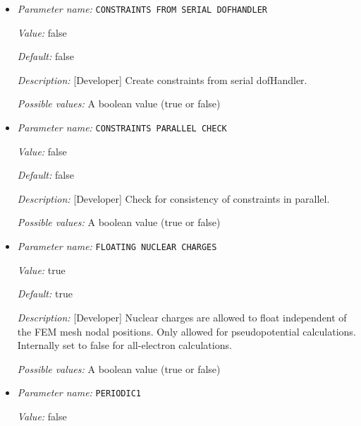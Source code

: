 \begin{itemize}
\item {\it Parameter name:} {\tt CONSTRAINTS FROM SERIAL DOFHANDLER}
\label{parameters:Boundary conditions/CONSTRAINTS FROM SERIAL DOFHANDLER}
\label{parameters:Boundary_20conditions/CONSTRAINTS_20FROM_20SERIAL_20DOFHANDLER}


{\it Value:} false


{\it Default:} false


{\it Description:} [Developer] Create constraints from serial dofHandler.


{\it Possible values:} A boolean value (true or false)
\item {\it Parameter name:} {\tt CONSTRAINTS PARALLEL CHECK}
\label{parameters:Boundary conditions/CONSTRAINTS PARALLEL CHECK}
\label{parameters:Boundary_20conditions/CONSTRAINTS_20PARALLEL_20CHECK}


{\it Value:} false


{\it Default:} false


{\it Description:} [Developer] Check for consistency of constraints in parallel.


{\it Possible values:} A boolean value (true or false)
\item {\it Parameter name:} {\tt FLOATING NUCLEAR CHARGES}
\label{parameters:Boundary conditions/FLOATING NUCLEAR CHARGES}
\label{parameters:Boundary_20conditions/FLOATING_20NUCLEAR_20CHARGES}


{\it Value:} true


{\it Default:} true


{\it Description:} [Developer] Nuclear charges are allowed to float independent of the FEM mesh nodal positions. Only allowed for pseudopotential calculations. Internally set to false for all-electron calculations.


{\it Possible values:} A boolean value (true or false)
\item {\it Parameter name:} {\tt PERIODIC1}
\label{parameters:Boundary conditions/PERIODIC1}
\label{parameters:Boundary_20conditions/PERIODIC1}


{\it Value:} false



\end{itemize}
